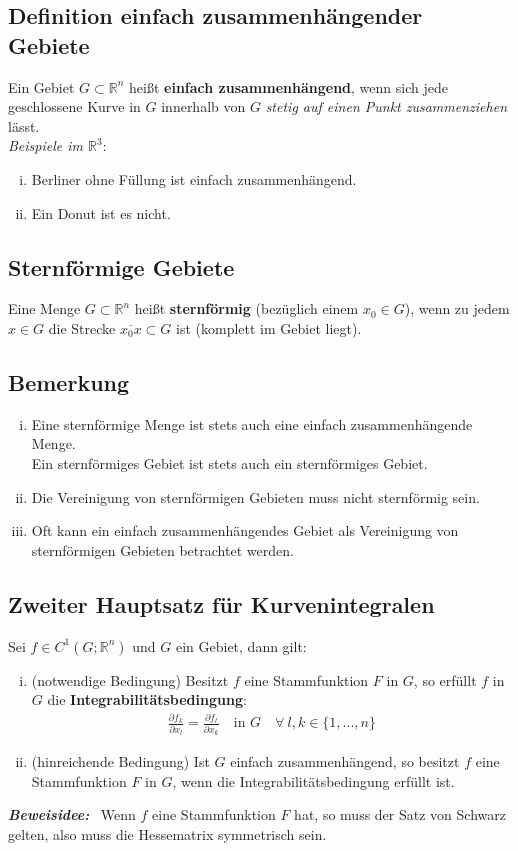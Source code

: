 \documentclass[11pt,a4paper]{book}
\newcommand {\R}	{\mathbb{R}}
\newcommand {\Rn}	{\mathbb{R}^n}
\newcommand{\1}    	{\mathbbm{1}}
\newcommand{\Beweis}[1][Beweis]
{\begin{mdframed}[backgroundcolor=gray!10,linewidth=0pt]\noindent\textit{\textbf{{#1}:}}~}
\newcommand{\QED}	{\end{mdframed}}
\begin{document}
\subsection{Definition einfach zusammenhängender Gebiete}
Ein Gebiet \(G \subset \Rn\) heißt \textbf{einfach zusammenhängend}, wenn sich jede geschlossene Kurve in \(G\) innerhalb von \(G\) \textit{stetig auf einen Punkt zusammenziehen} lässt.\\
\textit{Beispiele im \(\R^3\)}:
\begin{enumerate}[(i)]
	\item Berliner ohne Füllung ist einfach zusammenhängend.
	\item Ein Donut ist es nicht.
\end{enumerate}

\subsection{Sternförmige Gebiete}
Eine Menge \(G \subset \Rn\) heißt \textbf{sternförmig} (bezüglich einem \(x_0 \in G\)), wenn zu jedem \(x \in G\) die Strecke \(\overline{x_0 x} \subset G\) ist (komplett im Gebiet liegt).

\subsection{Bemerkung}
\begin{enumerate}[(i)]
	\item Eine sternförmige Menge ist stets auch eine einfach zusammenhängende Menge.\\
	Ein sternförmiges Gebiet ist stets auch ein sternförmiges Gebiet.
	\item Die Vereinigung von sternförmigen Gebieten muss nicht sternförmig sein.
	\item Oft kann ein einfach zusammenhängendes Gebiet als Vereinigung von sternförmigen Gebieten betrachtet werden.
\end{enumerate}

\subsection{Zweiter Hauptsatz für Kurvenintegralen}
Sei \(f \in C^1(G;\Rn)\) und \(G\) ein Gebiet, dann gilt:
\begin{enumerate}[(i)]
	\item (notwendige Bedingung) Besitzt \(f\) eine Stammfunktion \(F\) in \(G\), so erfüllt \(f\) in \(G\) die \textbf{Integrabilitätsbedingung}:
	\begin{align*}
		\frac{\partial f_k}{\partial x_l} = \frac{\partial f_l}{\partial x_k} \quad \textrm{in } G \quad \forall~ l,k \in \{1, ..., n\}
	\end{align*}
	\item (hinreichende Bedingung) Ist \(G\) einfach zusammenhängend, so besitzt \(f\) eine Stammfunktion \(F\) in \(G\), wenn die Integrabilitätsbedingung erfüllt ist.
\end{enumerate}
\Beweis[Beweisidee]
Wenn \(f\) eine Stammfunktion \(F\) hat, so muss der Satz von Schwarz gelten, also muss die Hessematrix symmetrisch sein.
\QED
\end{document}

